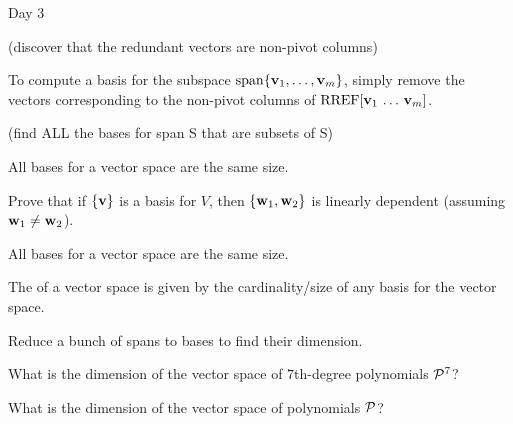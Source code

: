
\begin{applicationActivities}{Day 3}

\begin{activity}{10}
  (discover that the redundant vectors are non-pivot columns)
\end{activity}

\begin{fact}
  To compute a basis for the subspace \(\vspan\{\vect v_1,\dots,\vect v_m\}\),
  simply remove the vectors corresponding to the non-pivot columns of
  \(\RREF[\vect v_1\,\dots\,\vect v_m]\).
\end{fact}

\begin{activity}{10}
  (find ALL the bases for span S that are subsets of S)
\end{activity}

\begin{fact}
  All bases for a vector space are the same size.
\end{fact}

\begin{activity}{10}
  Prove that if \(\{\vect v\}\) is a basis for \(V\),
  then \(\{\vect w_1,\vect w_2\}\) is linearly dependent (assuming
  \(\vect w_1\not=\vect w_2\)).
\end{activity}

\begin{fact}
  All bases for a vector space are the same size.
\end{fact}

\begin{definition}
  The  of a vector space is given by the cardinality/size
  of any basis for the vector space.
\end{definition}

\begin{activity}{10}
  Reduce a bunch of spans to bases to find their dimension.
\end{activity}

\begin{activity}{5}
  What is the dimension of the vector space of \(7\)th-degree polynomials
  \(\P^7\)?
\end{activity}

\begin{activity}{5}
  What is the dimension of the vector space of polynomials
  \(\P\)?
\end{activity}


\end{applicationActivities}
